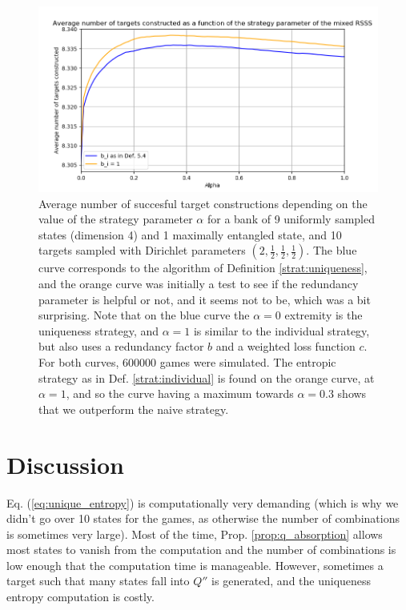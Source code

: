 \begin{figure}[h!]
    \centering
    \includegraphics[scale=0.65]{images/locc_comparison.png}
    \caption{Average number of succesful target constructions depending on the value of the strategy parameter $\alpha$ for a bank of 9 uniformly sampled states (dimension 4) and 1 maximally entangled state, and 10 targets sampled with Dirichlet parameters $\left(2, \frac{1}{2}, \frac{1}{2}, \frac{1}{2}\right)$. The blue curve corresponds to the algorithm of Definition \ref{strat:uniqueness}, and the orange curve was initially a test to see if the redundancy parameter is helpful or not, and it seems not to be, which was a bit surprising. Note that on the blue curve the $\alpha = 0$ extremity is the uniqueness strategy, and $\alpha = 1$ is similar to the individual strategy, but also uses a redundancy factor $b$ and a weighted loss function $c$. For both curves, 600000 games were simulated. The entropic strategy as in Def. \ref{strat:individual} is found on the orange curve, at $\alpha = 1$, and so the curve having a maximum towards $\alpha = 0.3$ shows that we outperform the naive strategy.}
    \label{fig:strategy_comparison}
\end{figure}

\section{Discussion} \label{sec:strategies_discussion}

Eq. (\ref{eq:unique_entropy}) is computationally very demanding (which is why we didn't go over 10 states for the games, as otherwise the number of combinations is sometimes very large). Most of the time, Prop. \ref{prop:q_absorption} allows most states to vanish from the computation and the number of combinations is low enough that the computation time is manageable. However, sometimes a target such that many states fall into $Q''$ is generated, and the uniqueness entropy computation is costly.

